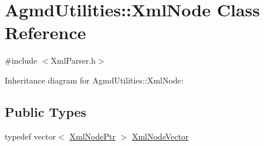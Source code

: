 \hypertarget{class_agmd_utilities_1_1_xml_node}{\section{Agmd\+Utilities\+:\+:Xml\+Node Class Reference}
\label{class_agmd_utilities_1_1_xml_node}
}


{\ttfamily \#include $<$Xml\+Parser.\+h$>$}



Inheritance diagram for Agmd\+Utilities\+:\+:Xml\+Node\+:
\subsection*{Public Types}
\begin{DoxyCompactItemize}
\item 
typedef vector$<$ \hyperlink{namespace_agmd_utilities_a5c62c53e06995bf0eddd56b55f44e62e}{Xml\+Node\+Ptr} $>$ \hyperlink{class_agmd_utilities_1_1_xml_node_a732265394a08c9960b72f0678c0272b7}{Xml\+Node\+Vector}
\end{DoxyCompactItemize}
